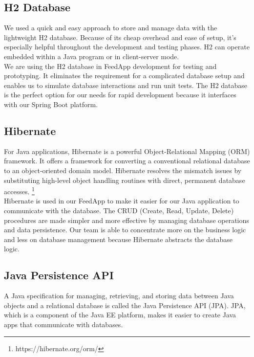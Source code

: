 \subsection{H2 Database}

\noindent We used a quick and easy approach to store and manage data with the lightweight H2 database. Because of its cheap overhead and ease of setup, it's especially helpful throughout the development and testing phases. H2 can operate embedded within a Java program or in client-server mode. \\

\noindent We are using the H2 database in FeedApp development for testing and prototyping. It eliminates the requirement for a complicated database setup and enables us to simulate database interactions and run unit tests. The H2 database is the perfect option for our needs for rapid development because it interfaces with our Spring Boot platform.


\subsection{Hibernate}

\noindent  For Java applications, Hibernate is a powerful Object-Relational Mapping (ORM) framework. It offers a framework for converting a conventional relational database to an object-oriented domain model. Hibernate resolves the mismatch issues by substituting high-level object handling routines with direct, permanent database accesses. \footnote{https://hibernate.org/orm/} \\

\noindent Hibernate is used in our FeedApp to make it easier for our Java application to communicate with the database. The CRUD (Create, Read, Update, Delete) procedures are made simpler and more effective by managing database operations and data persistence. Our team is able to concentrate more on the business logic and less on database management because Hibernate abstracts the database logic.

\subsection{Java Persistence API}

\noindent A Java specification for managing, retrieving, and storing data between Java objects and a relational database is called the Java Persistence API (JPA). JPA, which is a component of the Java EE platform, makes it easier to create Java apps that communicate with databases. \\

